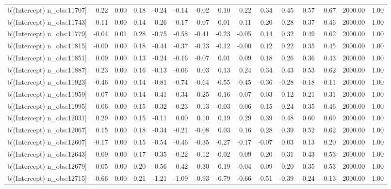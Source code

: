 \begin{table}[ht]
\begin{tabular}{rrrrrrrrrrrrrrr}
  b[(Intercept) n\_obs:11707] & 0.22 & 0.00 & 0.18 & -0.24 & -0.14 & -0.02 & 0.10 & 0.22 & 0.34 & 0.45 & 0.57 & 0.67 & 2000.00 & 1.00 \\ 
  b[(Intercept) n\_obs:11743] & 0.11 & 0.00 & 0.14 & -0.26 & -0.17 & -0.07 & 0.01 & 0.11 & 0.20 & 0.28 & 0.37 & 0.46 & 2000.00 & 1.00 \\ 
  b[(Intercept) n\_obs:11779] & -0.04 & 0.01 & 0.28 & -0.75 & -0.58 & -0.41 & -0.23 & -0.05 & 0.14 & 0.32 & 0.49 & 0.62 & 2000.00 & 1.00 \\ 
  b[(Intercept) n\_obs:11815] & -0.00 & 0.00 & 0.18 & -0.44 & -0.37 & -0.23 & -0.12 & -0.00 & 0.12 & 0.22 & 0.35 & 0.45 & 2000.00 & 1.00 \\ 
  b[(Intercept) n\_obs:11851] & 0.09 & 0.00 & 0.13 & -0.24 & -0.16 & -0.07 & 0.01 & 0.09 & 0.18 & 0.26 & 0.36 & 0.43 & 2000.00 & 1.00 \\ 
  b[(Intercept) n\_obs:11887] & 0.23 & 0.00 & 0.16 & -0.13 & -0.06 & 0.03 & 0.13 & 0.24 & 0.34 & 0.43 & 0.53 & 0.62 & 2000.00 & 1.00 \\ 
  b[(Intercept) n\_obs:11923] & -0.46 & 0.00 & 0.14 & -0.81 & -0.74 & -0.64 & -0.55 & -0.45 & -0.36 & -0.28 & -0.18 & -0.11 & 2000.00 & 1.00 \\ 
  b[(Intercept) n\_obs:11959] & -0.07 & 0.00 & 0.14 & -0.41 & -0.34 & -0.25 & -0.16 & -0.07 & 0.03 & 0.12 & 0.21 & 0.31 & 2000.00 & 1.00 \\ 
  b[(Intercept) n\_obs:11995] & 0.06 & 0.00 & 0.15 & -0.32 & -0.23 & -0.13 & -0.03 & 0.06 & 0.15 & 0.24 & 0.35 & 0.46 & 2000.00 & 1.00 \\ 
  b[(Intercept) n\_obs:12031] & 0.29 & 0.00 & 0.15 & -0.11 & 0.00 & 0.10 & 0.19 & 0.29 & 0.39 & 0.48 & 0.60 & 0.69 & 2000.00 & 1.00 \\ 
  b[(Intercept) n\_obs:12067] & 0.15 & 0.00 & 0.18 & -0.34 & -0.21 & -0.08 & 0.03 & 0.16 & 0.28 & 0.39 & 0.52 & 0.62 & 2000.00 & 1.00 \\ 
  b[(Intercept) n\_obs:12607] & -0.17 & 0.00 & 0.15 & -0.54 & -0.46 & -0.35 & -0.27 & -0.17 & -0.07 & 0.03 & 0.13 & 0.20 & 2000.00 & 1.00 \\ 
  b[(Intercept) n\_obs:12643] & 0.09 & 0.00 & 0.17 & -0.35 & -0.22 & -0.12 & -0.02 & 0.09 & 0.20 & 0.31 & 0.43 & 0.53 & 2000.00 & 1.00 \\ 
  b[(Intercept) n\_obs:12679] & -0.05 & 0.00 & 0.20 & -0.56 & -0.42 & -0.30 & -0.19 & -0.04 & 0.09 & 0.20 & 0.35 & 0.53 & 2000.00 & 1.00 \\ 
  b[(Intercept) n\_obs:12715] & -0.66 & 0.00 & 0.21 & -1.21 & -1.09 & -0.93 & -0.79 & -0.66 & -0.51 & -0.39 & -0.24 & -0.13 & 2000.00 & 1.00 \\ 

\end{tabular}
\end{table}

